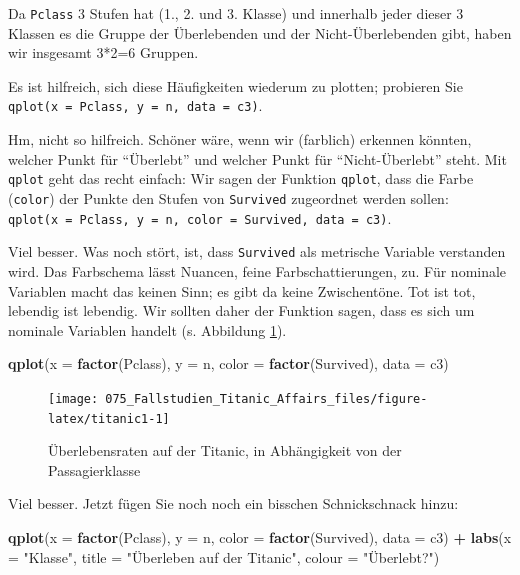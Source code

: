 \documentclass[12pt,ngerman,]{book}
\makeatletter
\newenvironment{Shaded}{\begin{snugshade}}{\end{snugshade}}
\newcommand{\KeywordTok}[1]{\textcolor[rgb]{0.13,0.29,0.53}{\textbf{#1}}}
\newcommand{\DataTypeTok}[1]{\textcolor[rgb]{0.13,0.29,0.53}{#1}}
\newcommand{\StringTok}[1]{\textcolor[rgb]{0.31,0.60,0.02}{#1}}
\newcommand{\OperatorTok}[1]{\textcolor[rgb]{0.81,0.36,0.00}{\textbf{#1}}}
\newcommand{\NormalTok}[1]{#1}
\newenvironment{kframe}{%
\medskip{}
\setlength{\fboxsep}{.8em}
 \def\at@end@of@kframe{}%
 \ifinner\ifhmode%
  \def\at@end@of@kframe{\end{minipage}}%
  \begin{minipage}{\columnwidth}%
 \fi\fi%
 \def\FrameCommand##1{\hskip\@totalleftmargin \hskip-\fboxsep
 \colorbox{shadecolor}{##1}\hskip-\fboxsep
     \hskip-\linewidth \hskip-\@totalleftmargin \hskip\columnwidth}%
 \MakeFramed {\advance\hsize-\width
   \@totalleftmargin\z@ \linewidth\hsize
   \@setminipage}}%
 {\par\unskip\endMakeFramed%
 \at@end@of@kframe}
\renewenvironment{Shaded}{\begin{kframe}}{\end{kframe}}
\theoremstyle{definition}
\theoremstyle{definition}
\theoremstyle{remark}
\makeatother
\begin{document}
Da \texttt{Pclass} 3 Stufen hat (1., 2. und 3. Klasse) und innerhalb
jeder dieser 3 Klassen es die Gruppe der Überlebenden und der
Nicht-Überlebenden gibt, haben wir insgesamt 3*2=6 Gruppen.

Es ist hilfreich, sich diese Häufigkeiten wiederum zu plotten; probieren
Sie \texttt{qplot(x\ =\ Pclass,\ y\ =\ n,\ data\ =\ c3)}.

Hm, nicht so hilfreich. Schöner wäre, wenn wir (farblich) erkennen
könnten, welcher Punkt für ``Überlebt'' und welcher Punkt für
``Nicht-Überlebt'' steht. Mit \texttt{qplot} geht das recht einfach: Wir
sagen der Funktion \texttt{qplot}, dass die Farbe (\texttt{color}) der
Punkte den Stufen von \texttt{Survived} zugeordnet werden sollen:
\texttt{qplot(x\ =\ Pclass,\ y\ =\ n,\ color\ =\ Survived,\ data\ =\ c3)}.

Viel besser. Was noch stört, ist, dass \texttt{Survived} als metrische
Variable verstanden wird. Das Farbschema lässt Nuancen, feine
Farbschattierungen, zu. Für nominale Variablen macht das keinen Sinn; es
gibt da keine Zwischentöne. Tot ist tot, lebendig ist lebendig. Wir
sollten daher der Funktion sagen, dass es sich um nominale Variablen
handelt (s. Abbildung \ref{fig:titanic1}).

\begin{Shaded}
\begin{Highlighting}[]
\KeywordTok{qplot}\NormalTok{(}\DataTypeTok{x =} \KeywordTok{factor}\NormalTok{(Pclass), }\DataTypeTok{y =}\NormalTok{ n, }\DataTypeTok{color =} \KeywordTok{factor}\NormalTok{(Survived), }\DataTypeTok{data =}\NormalTok{ c3)}
\end{Highlighting}
\end{Shaded}

\begin{figure}

{\centering \texttt{[image: 075\_Fallstudien\_Titanic\_Affairs\_files/figure-latex/titanic1-1]} 

}

\caption{Überlebensraten auf der Titanic, in Abhängigkeit von der Passagierklasse}\label{fig:titanic1}
\end{figure}

Viel besser. Jetzt fügen Sie noch noch ein bisschen Schnickschnack
hinzu:

\begin{Shaded}
\begin{Highlighting}[]
\KeywordTok{qplot}\NormalTok{(}\DataTypeTok{x =} \KeywordTok{factor}\NormalTok{(Pclass), }\DataTypeTok{y =}\NormalTok{ n, }\DataTypeTok{color =} \KeywordTok{factor}\NormalTok{(Survived), }\DataTypeTok{data =}\NormalTok{ c3) }\OperatorTok{+}\StringTok{ }
\StringTok{  }\KeywordTok{labs}\NormalTok{(}\DataTypeTok{x =} \StringTok{"Klasse"}\NormalTok{, }
       \DataTypeTok{title =} \StringTok{"Überleben auf der Titanic"}\NormalTok{,}
       \DataTypeTok{colour =} \StringTok{"Überlebt?"}\NormalTok{)}
\end{Highlighting}
\end{Shaded}
\end{document}
